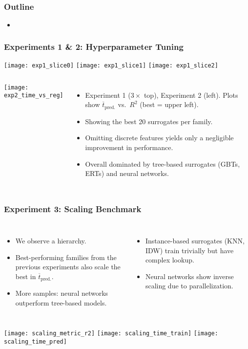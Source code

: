\begin{frame}
	\frametitle{Outline}
	\begin{itemize}
		\item %
	\end{itemize}
\end{frame}

\begin{frame}
	\frametitle{Experiments 1 \& 2: Hyperparameter Tuning}

	\texttt{[image: exp1\_slice0]}\hfill%
	\texttt{[image: exp1\_slice1]}\hfill%
	\texttt{[image: exp1\_slice2]}

	\begin{columns}
		\texttt{[image: exp2\_time\_vs\_reg]}

		\begin{itemize}
			\item
				Experiment 1 ($3\times$ top), Experiment 2 (left).
				Plots show $\overline{t}_\text{pred.}$ vs.~$R^2$ (best = upper
				left).
			\item
				Showing the best 20 surrogates per family.
			\item
				Omitting discrete features yields only a negligible
				improvement in performance.
			\item
				Overall dominated by tree-based surrogates (GBTs, ERTs) and
				neural networks.
		\end{itemize}
	\end{columns}

\end{frame}

\begin{frame}
	\frametitle{Experiment 3: Scaling Benchmark}
	\begin{columns}
		\column{0.5\textwidth}
		\begin{itemize}
			\item
				We observe a hierarchy.
			\item
				Best-performing families from the previous experiments also scale the
				best in $\overline{t}_\text{pred.}$.
			\item
				More samples: neural networks outperform tree-based models.
		\end{itemize}

		\column{0.5\textwidth}
		\begin{itemize}
			\item
				Instance-based surrogates (KNN, IDW) train trivially but have
				complex lookup.
			\item
				Neural networks show inverse scaling due to
				parallelization.
		\end{itemize}
	\end{columns}

	\vspace{1em}

	\texttt{[image: scaling\_metric\_r2]}
	\texttt{[image: scaling\_time\_train]}
	\texttt{[image: scaling\_time\_pred]}
\end{frame}

